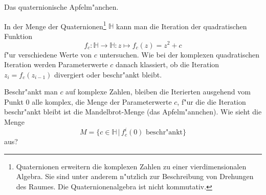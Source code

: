 \begin{aufgabe}
Das quaternionische Apfelm"anchen.
\end{aufgabe}

In der Menge der Quaternionen\footnote{Quaternionen erweitern die
komplexen Zahlen zu einer vierdimensionalen Algebra. Sie sind unter anderem
n"utzlich zur Beschreibung von Drehungen des Raumes.
Die Quaternionenalgebra ist nicht kommutativ.}
$\mathbb H$ kann man die Iteration
der quadratischen Funktion
\[
f_c\colon\mathbb H\to\mathbb H\colon
z\mapsto f_c(z)=z^2+c
\]
f"ur verschiedene Werte von $c$ untersuchen. Wie bei der komplexen
quadratischen Iteration werden Parameterwerte $c$ danach klassiert,
ob die Iteration $z_i=f_c(z_{i-1})$ divergiert oder beschr"ankt bleibt.

Beschr"ankt man $c$ auf komplexe Zahlen, bleiben die Iterierten ausgehend
vom Punkt $0$ alle komplex, die Menge der Parameterwerte $c$, f"ur die
die Iteration beschr"ankt bleibt ist die Mandelbrot-Menge (das Apfelm"annchen). 
Wie sieht die Menge
\[
M=\{c\in\mathbb H\,|\,f_c^i(0)\text{ beschr"ankt}\}
\]
aus?

